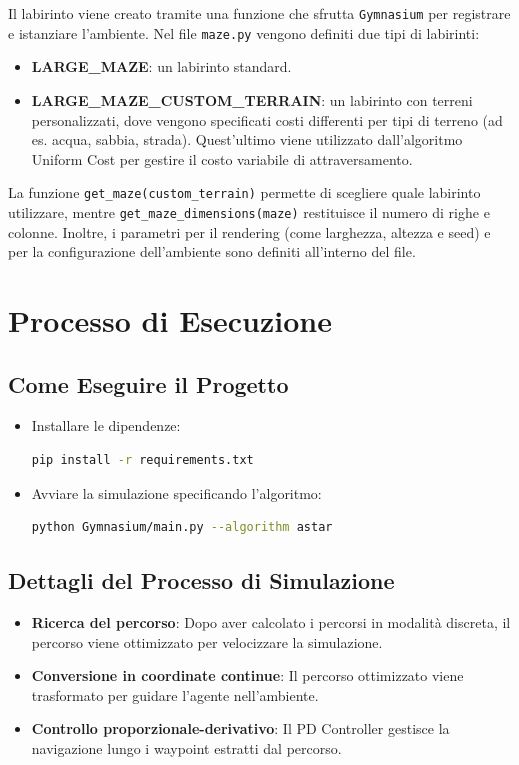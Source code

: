 \documentclass[12pt,a4paper]{article}
\begin{document}
Il labirinto viene creato tramite una funzione che sfrutta \texttt{Gymnasium} per registrare e istanziare l'ambiente. Nel file \texttt{maze.py} vengono definiti due tipi di labirinti:
\begin{itemize}
    \item \textbf{LARGE\_MAZE}: un labirinto standard.
    \item \textbf{LARGE\_MAZE\_CUSTOM\_TERRAIN}: un labirinto con terreni personalizzati, dove vengono specificati costi differenti per tipi di terreno (ad es. acqua, sabbia, strada). Quest'ultimo viene utilizzato dall'algoritmo Uniform Cost per gestire il costo variabile di attraversamento.
\end{itemize}

La funzione \texttt{get\_maze(custom\_terrain)} permette di scegliere quale labirinto utilizzare, mentre \texttt{get\_maze\_dimensions(maze)} restituisce il numero di righe e colonne. Inoltre, i parametri per il rendering (come larghezza, altezza e seed) e per la configurazione dell'ambiente sono definiti all'interno del file.

\section{Processo di Esecuzione}

\subsection*{Come Eseguire il Progetto}
\begin{itemize}
    \item Installare le dipendenze:
\begin{lstlisting}[language=bash]
pip install -r requirements.txt
\end{lstlisting}
    \item Avviare la simulazione specificando l'algoritmo:
\begin{lstlisting}[language=bash]
python Gymnasium/main.py --algorithm astar
\end{lstlisting}
\end{itemize}

\subsection*{Dettagli del Processo di Simulazione}
\begin{itemize}
    \item \textbf{Ricerca del percorso}: Dopo aver calcolato i percorsi in modalità discreta, il percorso viene ottimizzato per velocizzare la simulazione.
    \item \textbf{Conversione in coordinate continue}: Il percorso ottimizzato viene trasformato per guidare l'agente nell'ambiente.
    \item \textbf{Controllo proporzionale-derivativo}: Il PD Controller gestisce la navigazione lungo i waypoint estratti dal percorso.
\end{itemize}
\end{document}
